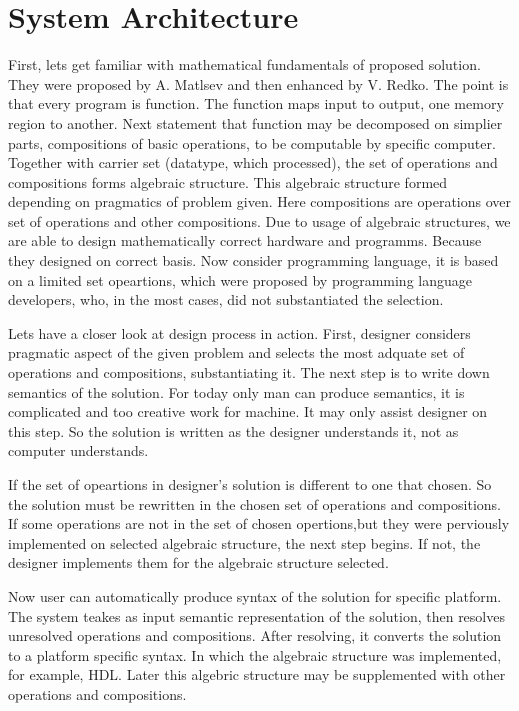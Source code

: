 \section{System Architecture}
First, lets get familiar with mathematical fundamentals of proposed solution. They were proposed by A. Matlsev\cite{maltsevalgebra} and then enhanced by V. Redko\cite{redko}. The point is that every program is function. The function maps input to output, one memory region to another. Next statement that function may be decomposed on simplier parts, compositions of basic operations, to be computable by specific computer. Together with carrier set (datatype, which processed), the set of operations and compositions forms algebraic structure. This algebraic structure formed depending on pragmatics of problem given. Here compositions are operations over set of operations and other compositions. Due to usage of algebraic structures, we are able to design mathematically correct hardware and programms. Because they designed on correct basis. Now consider programming language, it is based on a limited set opeartions, which were proposed by programming language developers, who, in the most cases, did not substantiated the selection.

Lets have a closer look at design process in action. First, designer considers pragmatic aspect of the given problem and selects the most adquate set of operations and compositions, substantiating it. The next step is to write down semantics of the solution. For today only man can produce semantics, it is complicated and too creative work for machine. It may only assist designer on this step. So the solution is written as the designer understands it, not as computer understands.

If the set of opeartions in designer's solution is different to one that chosen. So the solution must be rewritten in the chosen set of operations and compositions. If some operations are not in the set of chosen opertions,but they were perviously implemented on selected algebraic structure, the next step begins. If not, the designer implements them for the algebraic structure selected. 

Now user can automatically produce syntax of the solution for specific platform. The system teakes as input semantic representation of the solution, then resolves unresolved operations and compositions. After resolving, it converts the solution to a platform specific syntax. In which the algebraic structure was implemented, for example, HDL. Later this algebric structure may be supplemented with other operations and compositions.

